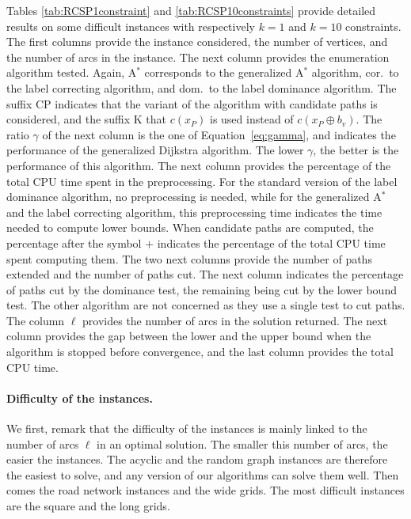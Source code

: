 \documentclass[11pt]{amsart}
\theoremstyle{plain}
\theoremstyle{remark}
\newcommand{\rplus}{\oplus}
\newcommand{\re}{x}
\begin{document}
Tables \ref{tab:RCSP1constraint} and \ref{tab:RCSP10constraints} provide detailed results on some difficult instances with respectively $k=1$ and $k=10$ constraints. The first columns provide the instance considered, the number of vertices, and the number of arcs in the instance. The next column provides the enumeration algorithm tested. Again, A$^{*}$ corresponds to the generalized A$^{*}$ algorithm, cor.~to the label correcting algorithm, and dom.~to the label dominance algorithm. The suffix CP indicates that the variant of the algorithm with candidate paths is considered, and the suffix K that $c(\re_{P})$ is used instead of $c(\re_{P} \rplus b_{v})$. The ratio $\gamma$ of the next column is the one of Equation~\eqref{eq:gamma}, and indicates the performance of the generalized Dijkstra algorithm. The lower $\gamma$, the better is the performance of this algorithm.  The next column provides the percentage of the total CPU time spent in the preprocessing. For the standard version of the label dominance algorithm, no preprocessing is needed, while for the generalized A$^{*}$ and the label correcting algorithm, this preprocessing time indicates the time needed to compute lower bounds. When candidate paths are computed, the percentage after the symbol $+$ indicates the percentage of the total CPU time spent computing them. The two next columns provide the number of paths extended and the number of paths cut. The next column indicates the percentage of paths cut by the dominance test, the remaining being cut by the lower bound test. The other algorithm are not concerned as they use a single test to cut paths. The column $\ell$ provides the number of arcs in the solution returned. The next column provides the gap between the lower and the upper bound when the algorithm is stopped before convergence, and the last column provides the total CPU time.

\paragraph{Difficulty of the instances.} We first, remark that the difficulty of the instances is mainly linked to the number of arcs $\ell$ in an optimal solution. The smaller this number of arcs, the easier the instances. The acyclic and the random graph instances are therefore the easiest to solve, and any version of our algorithms can solve them well. Then comes the road network instances and the wide grids. The most difficult instances are the square and the long grids. 
\end{document}
